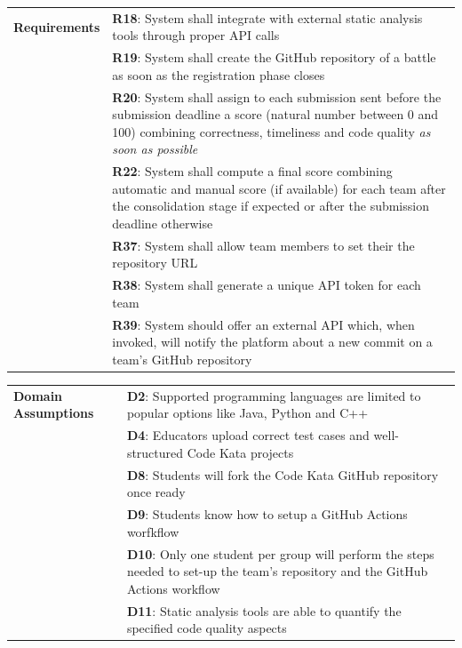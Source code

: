 \begin{center}
    \begin{tabular}{ |m{3cm}|m{10cm}| }
        \hline
        \textbf{Requirements} 
        & \textbf{R18}: System shall integrate with external static analysis tools through proper API calls \\
        & \textbf{R19}: System shall create the GitHub repository of a battle as soon as the registration phase closes \\
        & \textbf{R20}: System shall assign to each submission sent before the submission deadline a score (natural number between 0 and 100) combining correctness, timeliness and code quality \textit{as soon as possible} \\
        & \textbf{R22}: System shall compute a final score combining automatic and manual score (if available) for each team after the consolidation stage if expected or after the submission deadline otherwise \\
        & \textbf{R37}: System shall allow team members to set their the repository URL \\
        & \textbf{R38}: System shall generate a unique API token for each team \\
        & \textbf{R39}: System should offer an external API which, when invoked, will notify the platform about a new commit on a team’s GitHub repository \\
        \hline
    \end{tabular}
    \begin{tabular}{ |m{3cm}|m{10cm}| }
        \hline
        \textbf{Domain \newline Assumptions} 
        & \textbf{D2}: Supported programming languages are limited to popular options like Java, Python and C++ \\
        & \textbf{D4}: Educators upload correct test cases and well-structured Code Kata projects \\
        & \textbf{D8}: Students will fork the Code Kata GitHub repository once ready \\
        & \textbf{D9}: Students know how to setup a GitHub Actions worfkflow \\
        & \textbf{D10}: Only one student per group will perform the steps needed to set-up the team's repository and the GitHub Actions workflow \\
        & \textbf{D11}: Static analysis tools are able to quantify the specified code quality aspects \\
        \hline
    \end{tabular}
\end{center} 
